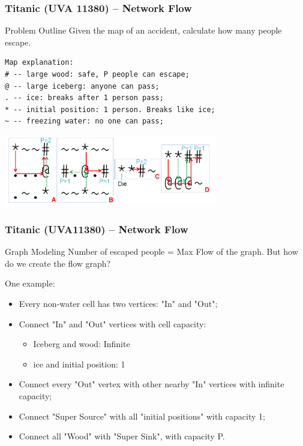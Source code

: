 \begin{frame}[fragile]
  \frametitle{Titanic (UVA 11380) -- Network Flow}

  \begin{block}{Problem Outline}
    Given the map of an accident, calculate how many people escape.
  \end{block}

\begin{verbatim}
Map explanation:
# -- large wood: safe, P people can escape;
@ -- large iceberg: anyone can pass;
. -- ice: breaks after 1 person pass;
* -- initial position: 1 person. Breaks like ice;
~ -- freezing water: no one can pass;
\end{verbatim}

  \begin{center}
    \includegraphics[width=0.7\textwidth]{../img/uva11380_halim}
  \end{center}
\end{frame}

\begin{frame}
  \frametitle{Titanic (UVA11380) -- Network Flow}
  \begin{block}{Graph Modeling}
    Number of escaped people = Max Flow of the graph. But how do we create the flow graph?
  \end{block}
  One example:
  \begin{itemize}
    \item Every non-water cell has two vertices: "In" and "Out";
    \item Connect "In" and "Out" vertices with cell capacity:
    \begin{itemize}
      \item Iceberg and wood: Infinite
      \item ice and initial position: 1
    \end{itemize}
    \item Connect every "Out" vertex with other nearby "In" vertices with infinite capacity;
    \item Connect "Super Source" with all "initial positions" with capacity 1;
    \item Connect all "Wood" with "Super Sink", with capacity P.
  \end{itemize}
\end{frame}

